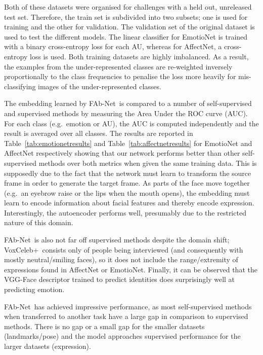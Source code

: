 \documentclass{bmvc2k}
\newcommand{\tabref}[1]{Table~\ref{#1}}
\def\networkname{FAb-Net}
\def\voxcombiname{VoxCeleb+}
\begin{document}
Both of these datasets were organised for challenges with a held out, unreleased test set.
Therefore, the train set is subdivided into two subsets; one is used for training and the other for validation.
The validation set of the original dataset is used to test the different models.
The linear classifier for EmotioNet is trained with a binary cross-entropy loss for each AU, whereas for AffectNet, a cross-entropy loss is used.
Both training datasets are highly imbalanced.
As a result, the examples from the under-represented classes are re-weighted inversely proportionally to the class frequencies to penalise the loss more heavily for mis-classifying images of the under-represented classes.


The embedding learned by \networkname~is compared to a number of self-supervised and supervised methods by measuring the Area Under the ROC curve (AUC).
For each class (e.g.~emotion or AU), the AUC is computed independently and the result is averaged over all classes.
The results are reported in \tabref{tab:emotionetresults} and \tabref{tab:affectnetresults} for EmotioNet and AffectNet respectively showing that our network performs better than other self-supervised methods over both metrics when given the same training data. 
This is supposedly due to the fact that the network must learn to transform the source frame in order to generate the target frame.  
As parts of the face move together (e.g.~an eyebrow raise or the lips when the mouth opens), the embedding must learn to encode information about facial features and thereby encode expression.
Interestingly, the autoencoder performs well, presumably due to the restricted nature of this domain.

\networkname~is also not far off supervised methods despite the domain shift; \voxcombiname~consists only of people being interviewed (and consequently with mostly neutral/smiling faces), so it does not include the range/extremity of expressions found in AffectNet or EmotioNet.
Finally, it can be observed that the VGG-Face descriptor trained to predict identities does surprisingly well at predicting emotion.

 \networkname~has achieved impressive performance, as most self-supervised methods when transferred to another task have a large gap in comparison to supervised methods.
There is no gap or a small gap for the smaller datasets (landmarks/pose) and the model approaches supervised performance for the larger datasets (expression). 
\end{document}
